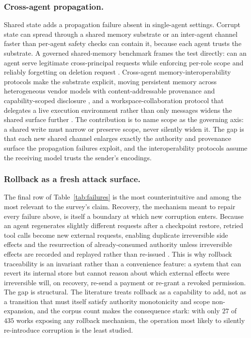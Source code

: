 \subsubsection{Cross-agent propagation.}
Shared state adds a propagation failure absent in single-agent settings. Corrupt state can spread through a shared memory substrate or an inter-agent channel faster than per-agent safety checks can contain it, because each agent trusts the substrate. A governed shared-memory benchmark frames the test directly: can an agent serve legitimate cross-principal requests while enforcing per-role scope and reliably forgetting on deletion request \citep{ren2026gatemem}. Cross-agent memory-interoperability protocols make the substrate explicit, moving persistent memory across heterogeneous vendor models with content-addressable provenance and capability-scoped disclosure \citep{ravindran2026portablemem}, and a workspace-collaboration protocol that delegates a live execution environment rather than only messages widens the shared surface further \citep{nie2026awcp}. The contribution is to name scope as the governing axis: a shared write must narrow or preserve scope, never silently widen it. The gap is that each new shared channel enlarges exactly the authority and provenance surface the propagation failures exploit, and the interoperability protocols assume the receiving model trusts the sender's encodings.

\subsubsection{Rollback as a fresh attack surface.}
The final row of Table~\ref{tab:failures} is the most counterintuitive and among the most relevant to the survey's claim. Recovery, the mechanism meant to repair every failure above, is itself a boundary at which new corruption enters. Because an agent regenerates slightly different requests after a checkpoint restore, retried tool calls become new external requests, enabling duplicate irreversible side effects and the resurrection of already-consumed authority unless irreversible effects are recorded and replayed rather than re-issued \citep{zheng2026acrfence}. This is why rollback traceability is an invariant rather than a convenience feature: a system that can revert its internal store but cannot reason about which external effects were irreversible will, on recovery, re-send a payment or re-grant a revoked permission. The gap is structural. The literature treats rollback as a capability to add, not as a transition that must itself satisfy authority monotonicity and scope non-expansion, and the corpus count makes the consequence stark: with only $27$ of $435$ works exposing any rollback mechanism, the operation most likely to silently re-introduce corruption is the least studied.

